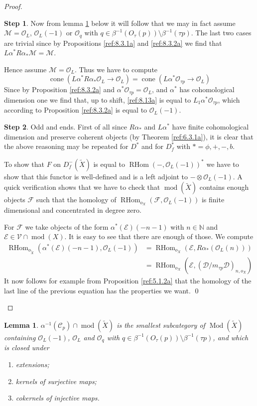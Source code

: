 \documentclass{amsproc}
\def \NN{{\mathbb N}}
\def\Cscr{{\mathcal C}}
\def\Dscr{{\mathcal D}}
\def\Escr{{\mathcal E}}
\def\Fscr{{\mathcal F}}
\def\Mscr{{\mathcal M}}
\def\Oscr{{\mathcal O}}
\def\Vscr{{\mathcal V}}
\DeclareMathOperator{\cone}{cone}
\def\RHom{\operatorname {RHom}}
\def\coh{\operatorname {mod}}
\def\Qch{\operatorname {Mod}}
\def\r{\rightarrow}
\newtheorem{lemmas}{Lemma}[subsection]
\theoremstyle{definition}
\newtheorem{step}{Step}
\theoremstyle{remark}
\numberwithin{equation}{section}
\numberwithin{table}{section}
\numberwithin{figure}{section}
\begin{document}
\begin{proof}
\begin{step}
Now from lemma \ref{ref:8.4.2a} below it will follow that we
may in fact assume $\Mscr=\Oscr_L$, $\Oscr_L(-1)$ or $\Oscr_q$ with
$q\in \beta^{-1}(O_\tau(p))\setminus \beta^{-1}(\tau p)$. The last two
cases are trivial since by Propositions \ref{ref:8.3.1a} and
\ref{ref:8.3.2a} we find that $L\alpha^\ast R\alpha_\ast \Mscr=\Mscr$.

Hence assume $\Mscr=\Oscr_L$. Thus we have to compute
\begin{equation}
\label{ref:8.13a}
\cone(L\alpha^\ast R\alpha_\ast
\Oscr_L\r \Oscr_L)=\cone(L\alpha^\ast \Oscr_{\tau p}\r \Oscr_L)
\end{equation}
Since by Proposition \ref{ref:8.3.2a} and $\alpha^\ast\Oscr_{\tau
  p}=\Oscr_L$, and $\alpha^\ast$ has cohomological dimension one we
find that, up to shift, \eqref{ref:8.13a} is equal to $L_1\alpha^\ast
\Oscr_{\tau p}$, which according to Proposition \ref{ref:8.3.2a} is
equal to $\Oscr_L(-1)$.
\end{step}
\begin{step} Odd and ends. First of all since $R\alpha_\ast$ and
  $L\alpha^\ast$ have finite cohomological dimension and preserve
  coherent objects (by Theorem \ref{ref:6.3.1a}),
  it is clear that the above reasoning may be repeated for $D^\ast$
  and for $D_f^\ast$ with $\ast=\phi,+,-,b$.

  To show that $F$ on $D^-_f(\tilde{X})$ is equal to
  $\RHom(-,\Oscr_L(-1))^\ast$ we have to show that this functor is
  well-defined and is a left adjoint to $-\otimes \Oscr_L(-1)$. A
  quick verification shows that we have to check that
  $\coh(\tilde{X})$ contains enough objects $\Fscr$ such that the
  homology of $\RHom_{o_X}(\Fscr,\Oscr_L(-1))$ is finite dimensional
  and concentrated in degree zero.

For $\Fscr$ we take objects  of  the form $\alpha^\ast(\Escr)(-n-1)$ with
$n\in\NN$ and
$\Escr\in \Vscr\cap \coh(X)$. It is easy to see that there are enough of
those. We compute
\begin{align*}
\RHom_{o_{\tilde{X}}}(\alpha^\ast(\Escr)(-n-1),\Oscr_L(-1))
&=\RHom_{o_X}(\Escr,R\alpha_\ast(\Oscr_L(n)))\\
&=\RHom_{o_X}(\Escr,(\Dscr/m_{\tau p}\Dscr)_{n,o_X})
\end{align*}
It now follows for example from Proposition
\ref{ref:5.1.2a} that the homology of the last line of the
previous equation has the properties we want.  \qed\end{step}
\def\qed{}\end{proof}
\begin{lemmas}
\label{ref:8.4.2a}
$\alpha^{-1}(\Cscr_p)\cap \coh(\tilde{X})$ is the smallest subcategory
of $\Qch(\tilde{X})$ containing $\Oscr_L(-1)$, $\Oscr_L$ and $\Oscr_q$
with $q\in \beta^{-1}(O_\tau(p))\setminus \beta^{-1}(\tau p)$, and
which is closed under
\begin{enumerate}
\item
extensions;
\item
kernels of surjective maps;
\item
cokernels of injective maps.
\end{enumerate}
\end{lemmas}
\end{document}
